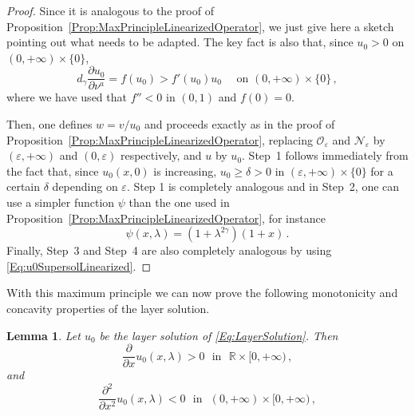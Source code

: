 \documentclass[12pt,reqno]{amsart}
\newtheorem{lemma}[theorem]{Lemma}
\theoremstyle{definition}
\theoremstyle{remark}
\newcommand{\con}[1]{\mathbb{#1}}
\newcommand{\R}{\con{R}} %
\newcommand{\ncal}{\mathcal{N}}
\newcommand{\ocal}{\mathcal{O}}
\newcommand{\s}{\gamma}
\numberwithin{equation}{section}
\begin{document}
\begin{proof}
Since it is analogous to the proof of Proposition~\ref{Prop:MaxPrincipleLinearizedOperator}, we just give here a sketch pointing out what needs to be adapted. The key fact is also that, since $u_0>0$ on $(0,+\infty)\times\{0\}$,
\begin{equation}
\label{Eq:u0SupersolLinearized}
d_\s \dfrac{\partial u_0}{\partial \nu^a}  = f(u_0) > f'(u_0) u_0 \quad \textrm{ on } (0, +\infty)\times \{0\}\,,
\end{equation}
where we have used that $f''<0$ in $(0,1)$ and $f(0)=0$.

Then, one defines $w = v/u_0$ and proceeds exactly as in the proof of Proposition~\ref{Prop:MaxPrincipleLinearizedOperator}, replacing $\ocal_\varepsilon$ and $\ncal_\varepsilon$ by $(\varepsilon,+\infty)$ and $(0,\varepsilon)$ respectively, and $u$ by $u_0$. Step~1 follows immediately from the fact that, since $u_0(x,0)$ is increasing, $u_0 \geq \delta > 0$ in $(\varepsilon, +\infty)\times \{0\}$ for a certain $\delta$ depending on $\varepsilon$. Step 1 is completely analogous and in Step~2, one can use a simpler function $\psi$ than the one used in Proposition~\ref{Prop:MaxPrincipleLinearizedOperator}, for instance 
$$
\psi(x,\lambda) = (1+\lambda^{2\s})(1+x)\,.
$$
Finally, Step~3 and Step~4 are also completely analogous by using \eqref{Eq:u0SupersolLinearized}.
\end{proof}

With this maximum principle we can now prove the following monotonicity and concavity properties of the layer solution.

\begin{lemma}
\label{Lemma:MonotonicityLayer}
Let $u_0$ be the layer solution of \eqref{Eq:LayerSolution}. Then
$$ \frac{\partial}{\partial x} u_0(x,\lambda) > 0 \ \ \ \text{in} \ \ \ \R\times [0,+\infty)\,, $$
and
$$ \frac{\partial^2}{\partial x^2} u_0(x,\lambda) < 0 \ \ \ \text{in} \ \ \ (0,+\infty)\times [0,+\infty)\,, $$
\end{lemma}
\end{document}
